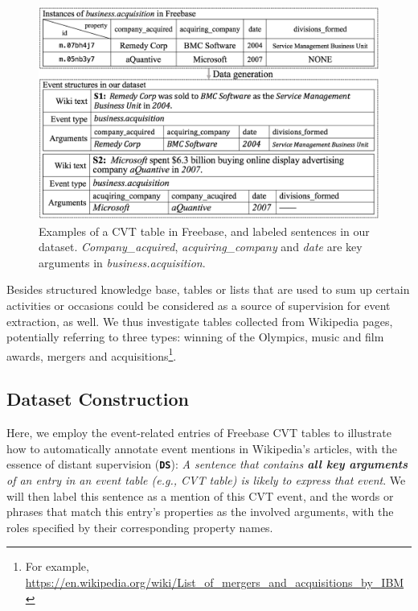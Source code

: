\begin{figure}[h]
	\centering
	\includegraphics[width=.48\textwidth]{temp}
	\caption{Examples of a CVT table in Freebase, and labeled sentences in our dataset. \emph{Company\_acquired}, \emph{acquiring\_company} and \emph{date} are key arguments in \emph{business.acquisition}. \label{fig:3}}
\end{figure}

Besides structured knowledge base, tables or lists that are used to sum up certain activities or occasions could be considered as a source of supervision for event extraction, as well. 
We thus investigate tables collected from Wikipedia pages, potentially referring to three types: winning of the Olympics, music and film awards, mergers and acquisitions\footnote{For example, \url{https://en.wikipedia.org/wiki/List_of_mergers_and_acquisitions_by_IBM}}.

\subsection{Dataset Construction\label{datagen}} 
Here, we employ the event-related entries of Freebase CVT tables to illustrate how to automatically annotate event mentions in Wikipedia's articles, with the essence of distant supervision (\textbf{\texttt{DS}}): \textit{A sentence that contains \textbf{all key arguments} of an entry in an event table (e.g., CVT table) is likely to express that event}.
We will then label this sentence as a mention of this CVT event, and the words or phrases that match this entry's properties as the involved arguments, with the roles specified by their corresponding property names. 

